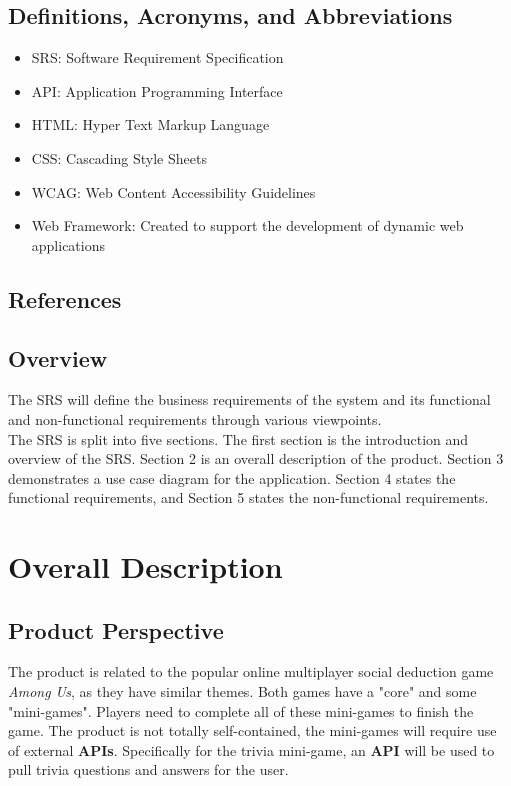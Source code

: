 \documentclass[]{article}
\begin{document}
\subsection{Definitions, Acronyms, and Abbreviations}
\label{sub:definitions_acronyms_and_abbreviations}
\begin{itemize}
    \item SRS: Software Requirement Specification
    \item API: Application Programming Interface
    \item HTML: Hyper Text Markup Language
    \item CSS: Cascading Style Sheets
    \item WCAG: Web Content Accessibility Guidelines
    \item Web Framework: Created to support the development of dynamic web applications
\end{itemize}
\newpage
\subsection{References}
\label{label:references}



\subsection{Overview}
\label{sub:overview}
The SRS will define the business requirements of the system and its functional and non-functional requirements through various viewpoints. 
\\

The SRS is split into five sections. The first section is the introduction and overview of the SRS. Section 2 is an overall description of the product. Section 3 demonstrates a use case diagram for the application. Section 4 states the functional requirements, and Section 5 states the non-functional requirements.


\section{Overall Description}
\label{sec:overall_description}
\subsection{Product Perspective}
\label{sub:product_perspective}
The product is related to the popular online multiplayer social deduction game \textit{Among Us}, as they have similar themes. Both games have a "core" and some "mini-games". Players need to complete all of these mini-games to finish the game. The product is not totally self-contained, the mini-games will require use of external \textbf{APIs}. Specifically for the trivia mini-game, an \textbf{API} will be used to pull trivia questions and answers for the user.
\\
\end{document}
